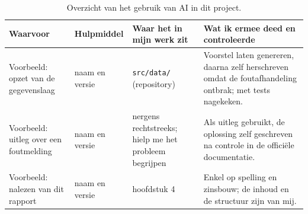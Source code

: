 \begin{table}[htbp]
  \centering\small
  \begin{tabular}{p{}p{}p{}p{}}
    \toprule
    \textbf{Waarvoor} & \textbf{Hulpmiddel} & \textbf{Waar het in mijn werk zit} & \textbf{Wat ik ermee deed en controleerde} \\
    \midrule
    Voorbeeld: opzet van de gegevenslaag
      & naam en versie
      & \texttt{src/data/} \newline (repository)
      & Voorstel laten genereren, daarna zelf herschreven omdat de foutafhandeling ontbrak; met tests nagekeken. \\
    Voorbeeld: uitleg over een foutmelding
      & naam en versie
      & nergens rechtstreeks; hielp me het probleem begrijpen
      & Als uitleg gebruikt, de oplossing zelf geschreven na controle in de officiële documentatie. \\
    Voorbeeld: nalezen van dit rapport
      & naam en versie
      & hoofdstuk 4
      & Enkel op spelling en zinsbouw; de inhoud en de structuur zijn van mij. \\
    \bottomrule
  \end{tabular}
  \caption[Gebruik van AI in dit project]{\label{tab:ai}%
    Overzicht van het gebruik van AI in dit project.}
\end{table}

\section{}%
\label{sec:ai-eigenwerk}


\section{}%
\label{sec:ai-regelgeving}

